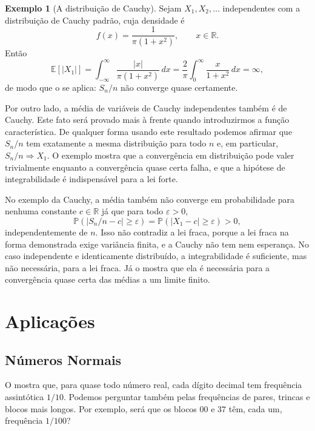 \documentclass[12pt,portuguese]{article}
\theoremstyle{definition}
\newtheorem{example}[example]{Exemplo}
\theoremstyle{plainexercise}
\theoremstyle{starredexercise}
\theoremstyle{definition}
\begin{document}
\begin{example}[A distribuição de Cauchy]\label{ex:cauchy}
Sejam $X_1,X_2,\ldots$ independentes com a distribuição de Cauchy padrão, cuja
densidade é
\[
f(x)=\frac{1}{\pi(1+x^2)},
\qquad x\in\mathbb{R}.
\]
Então
\[
\mathbb{E}[|X_1|]
=
\int_{-\infty}^{\infty}\frac{|x|}{\pi(1+x^2)}\,dx
=
\frac{2}{\pi}\int_0^{\infty}\frac{x}{1+x^2}\,dx
=
\infty,
\]
de modo que o  se aplica: $S_n/n$ não converge quase
certamente.

Por outro lado, a média de variáveis de Cauchy independentes também é de
Cauchy. Este fato será provado mais à frente quando introduzirmos a função característica.
De qualquer forma usando este resultado podemos afirmar que $S_n/n$ tem
exatamente a mesma distribuição para todo $n$ e, em particular,
$S_n/n\Rightarrow X_1$. O exemplo mostra que a convergência em distribuição
pode valer trivialmente enquanto a convergência quase certa falha, e que a
hipótese de integrabilidade é indispensável para a lei forte.
\end{example}

No exemplo da Cauchy, a média também não converge em probabilidade para
nenhuma constante $c\in\mathbb{R}$ já que para todo $\varepsilon>0$,
\[
\mathbb{P}(|S_n/n-c|\geqslant\varepsilon)
=\mathbb{P}(|X_1-c|\geqslant\varepsilon)>0,
\]
independentemente de $n$. Isso não contradiz
a lei fraca, porque a lei fraca na forma demonstrada exige variância finita, e
a Cauchy não tem nem esperança. No caso independente e identicamente
distribuído, a integrabilidade é suficiente, mas não necessária, para a lei
fraca. Já o  mostra que ela é necessária para a
convergência quase certa das médias a um limite finito.

\section{Aplicações}\label{sec:aplicacoes}

\subsection{Números Normais}\label{subsec:numeros-normais}

O  mostra que, para quase todo número real, cada
dígito decimal tem frequência assintótica $1/10$. Podemos perguntar também
pelas frequências de pares, trincas e blocos mais longos. Por exemplo, será
que os blocos $00$ e $37$ têm, cada um, frequência $1/100$?
\end{document}

